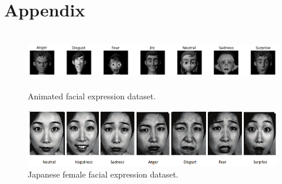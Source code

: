 \documentclass{article}
\begin{document}
\renewcommand\thefigure{\thesection.\arabic{figure}}    

\section{Appendix}

\setcounter{figure}{0}    

\begin{figure}[H]
    \begin{center}  
      \includegraphics[width=\textwidth,height=2.5cm]{animatedface.png}
      \caption{Animated facial expression dataset.}
      \label{appendix:face-ds}
    \end{center}
\end{figure}

\begin{figure}[H]
    \begin{center}
      \includegraphics[width=\textwidth,height=2.5cm]{jpwomen.jpg}
      \caption{Japanese female facial expression dataset.}
      \label{appendix:jap-ds}
    \end{center}
\end{figure}

\end{document}

